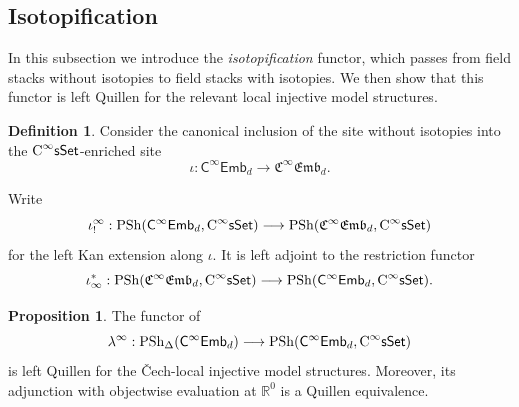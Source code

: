 \documentclass{amsart}
\newcommand{\cat}[1]{\mathsf{#1}}
\newcommand{\sset}{\cat{sSet}}
\newcommand{\CsSet}{\textnormal{C}^{\infty}\sset}
\newcommand{\fembnoniso}[1]{\cat{C}^{\infty}\cat{Emb}_{#1}}
\newcommand{\femb}[1]{\mathfrak{C}^{\infty}\mathfrak{Emb}_{#1}}
\newcommand{\psh}{\mathrm{PSh}}
\newcommand{\spsh}{\mathrm{PSh}_{\Delta}}
\newcommand{\RR}{{\mathbb{R}}}
\theoremstyle{definition}
\newtheorem{definition}[equation]{Definition}
\newtheorem{proposition}[equation]{Proposition}
\numberwithin{equation}{subsection}
\numberwithin{subsubsection}{subsection}
\begin{document}
\subsection{Isotopification}\label{subsec:isotopification}

In this subsection we introduce the \emph{isotopification} functor, which
passes from field stacks without isotopies to field stacks with isotopies. We
then show that this functor is left Quillen for the relevant local injective
model structures.

\begin{definition}\label{def:useful.functors}
  Consider the canonical inclusion of the site without
  isotopies into the
  \( \CsSet \)-enriched site
  \[
    \iota:\fembnoniso{d}\longrightarrow \femb{d}.
  \]

  Write
  \[
    \iota_{!}^{\infty}:\psh(\fembnoniso{d}, \CsSet)\longrightarrow
    \psh(\femb{d}, \CsSet)
  \]
  for the left Kan
  extension along
  \( \iota \). It is
  left adjoint to the restriction functor
  \[
    \iota^{*}_{\infty}:\psh(\femb{d}, \CsSet)\longrightarrow
    \psh(\fembnoniso{d}, \CsSet).
  \]
\end{definition}

\begin{proposition}\label{prop:lambda.left.quillen}
  The functor of 
  \[
    \lambda^{\infty}:
    \spsh(\fembnoniso{d})
    \longrightarrow
    \psh(\fembnoniso{d},\CsSet)
  \]
  is left Quillen for the \v{C}ech-local injective model structures.
  Moreover, its adjunction with objectwise evaluation at \(\RR^0\) is a
  Quillen equivalence.
\end{proposition}
\end{document}
